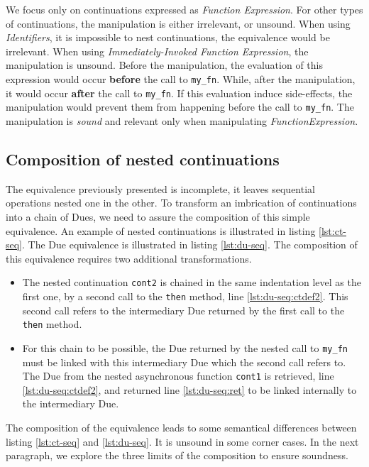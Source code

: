 We focus only on continuations expressed as \textit{Function Expression}.
For other types of continuations, the manipulation is either irrelevant, or unsound.
When using \textit{Identifiers}, it is impossible to nest continuations, the equivalence would be irrelevant.
When using \textit{Immediately-Invoked Function Expression}, the manipulation is unsound.
Before the manipulation, the evaluation of this expression would occur \textbf{before} the call to \texttt{my_fn}.
While, after the manipulation, it would occur \textbf{after} the call to \texttt{my_fn}.
If this evaluation induce side-effects, the manipulation would prevent them from happening before the call to \texttt{my_fn}.
The manipulation is \textit{sound} and relevant only when manipulating \textit{FunctionExpression}.

\subsection{Composition of nested continuations} \label{section:equivalence:composition}

The equivalence previously presented is incomplete, it leaves sequential operations nested one in the other.
To transform an imbrication of continuations into a chain of Dues, we need to assure the composition of this simple equivalence.
An example of nested continuations is illustrated in listing \ref{lst:ct-seq}.
The Due equivalence is illustrated in listing \ref{lst:du-seq}.
The composition of this equivalence requires two additional transformations.

\begin{itemize}
  \item The nested continuation \texttt{cont2} is chained in the same indentation level as the first one, by a second call to the \texttt{then} method, line \ref{lst:du-seq:ctdef2}.
  This second call refers to the intermediary Due returned by the first call to the \texttt{then} method.
  \item For this chain to be possible, the Due returned by the nested call to \texttt{my_fn} must be linked with this intermediary Due which the second call refers to.
  The Due from the nested asynchronous function \texttt{cont1} is retrieved, line \ref{lst:du-seq:ctdef2}, and returned line \ref{lst:du-seq:ret} to be linked internally to the intermediary Due.
\end{itemize}

The composition of the equivalence leads to some semantical differences between listing \ref{lst:ct-seq} and \ref{lst:du-seq}.
It is unsound in some corner cases.
In the next paragraph, we explore the three limits of the composition to ensure soundness.

